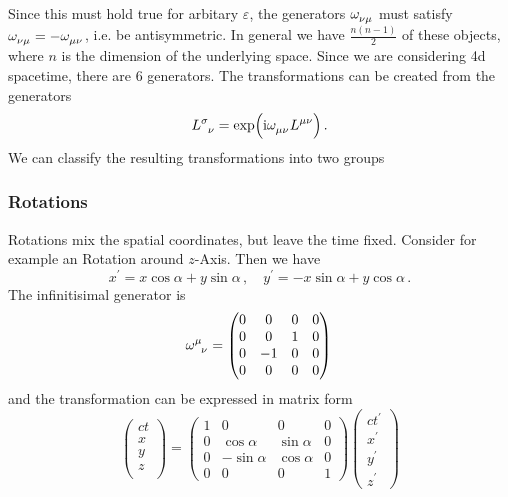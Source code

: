 Since this must hold true for arbitary $\varepsilon$, the generators
$\tensor{\omega}{_\nu_\mu}$ must satisfy
$\tensor{\omega}{_\nu_\mu}=-\tensor{\omega}{_\mu_\nu}$, i.e. be antisymmetric.
In general we have $\frac{n(n-1)}{2}$ of these objects, where $n$ is the
dimension of the underlying space.
Since we are considering 4d spacetime, there are $6$ generators. 
The transformations can be created from the generators
\begin{equation}
\tensor{L}{^\sigma_\nu}=\exp\left(\imI\tensor{\omega}{_\mu_\nu}\tensor{L}{^\mu^\nu}\right)\,.
\end{equation}
We can
classify the resulting transformations into two groups
\subsubsection{Rotations}
Rotations mix the spatial coordinates, but leave the time fixed. Consider for
example an Rotation around $z$-Axis. Then we have
\begin{equation}
x^\prime=x\cos\alpha+y\sin\alpha \, ,\quad y^\prime=-x\sin\alpha+y\cos\alpha \,
.
\end{equation}
The infinitisimal generator is 
\begin{equation}
 \tensor{\omega}{^\mu_\nu}
  =\begin{pmatrix}
  0&0 & 0&0\\
  0&0 &1&0\\
  0&-1&0 &0\\
  0&0 &0 &0
  \end{pmatrix}\, 
\end{equation}
and the transformation can be expressed in matrix form
\begin{equation}
  \begin{pmatrix}
  ct\\
  x\\
  y\\
  z\\
  \end{pmatrix}=
  \begin{pmatrix}
  1&0 & 0&0\\
  0&\cos\alpha &\sin\alpha&0\\
  0&-\sin\alpha&\cos\alpha &0\\
  0&0 &0 &1
  \end{pmatrix}
  \begin{pmatrix}
  ct^\prime\\
  x^\prime\\
  y^\prime\\
  z^\prime
  \end{pmatrix}
\end{equation}
